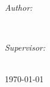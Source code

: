 \documentclass[12pt, letterpaper]{article}
\begin{document}
\vfill %


\begin{minipage}{0.4\textwidth}
	\begin{flushleft} \large
	\emph{Author:}\\
	\paperauthor
	\end{flushleft}
	\end{minipage}
	~
	\begin{minipage}{0.4\textwidth}
	\begin{flushright} \large
	\emph{Supervisor:} \\
	\papersupervisor
	\end{flushright}
\end{minipage}\\[1cm]

{\large \today}\\ %

\newpage
\end{document}
